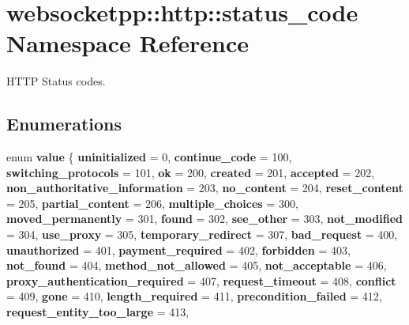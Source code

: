 \hypertarget{namespacewebsocketpp_1_1http_1_1status__code}{}\section{websocketpp\+:\+:http\+:\+:status\+\_\+code Namespace Reference}
\label{namespacewebsocketpp_1_1http_1_1status__code}


H\+T\+TP Status codes.  


\subsection*{Enumerations}
\begin{DoxyCompactItemize}
\item 
\mbox{\label{namespacewebsocketpp_1_1http_1_1status__code_ae0d61c309e053ee5673517b54e2886c6}} 
enum {\bfseries value} \{ \newline
{\bfseries uninitialized} = 0, 
{\bfseries continue\+\_\+code} = 100, 
{\bfseries switching\+\_\+protocols} = 101, 
{\bfseries ok} = 200, 
\newline
{\bfseries created} = 201, 
{\bfseries accepted} = 202, 
{\bfseries non\+\_\+authoritative\+\_\+information} = 203, 
{\bfseries no\+\_\+content} = 204, 
\newline
{\bfseries reset\+\_\+content} = 205, 
{\bfseries partial\+\_\+content} = 206, 
{\bfseries multiple\+\_\+choices} = 300, 
{\bfseries moved\+\_\+permanently} = 301, 
\newline
{\bfseries found} = 302, 
{\bfseries see\+\_\+other} = 303, 
{\bfseries not\+\_\+modified} = 304, 
{\bfseries use\+\_\+proxy} = 305, 
\newline
{\bfseries temporary\+\_\+redirect} = 307, 
{\bfseries bad\+\_\+request} = 400, 
{\bfseries unauthorized} = 401, 
{\bfseries payment\+\_\+required} = 402, 
\newline
{\bfseries forbidden} = 403, 
{\bfseries not\+\_\+found} = 404, 
{\bfseries method\+\_\+not\+\_\+allowed} = 405, 
{\bfseries not\+\_\+acceptable} = 406, 
\newline
{\bfseries proxy\+\_\+authentication\+\_\+required} = 407, 
{\bfseries request\+\_\+timeout} = 408, 
{\bfseries conflict} = 409, 
{\bfseries gone} = 410, 
\newline
{\bfseries length\+\_\+required} = 411, 
{\bfseries precondition\+\_\+failed} = 412, 
{\bfseries request\+\_\+entity\+\_\+too\+\_\+large} = 413, 

\end{DoxyCompactItemize}
